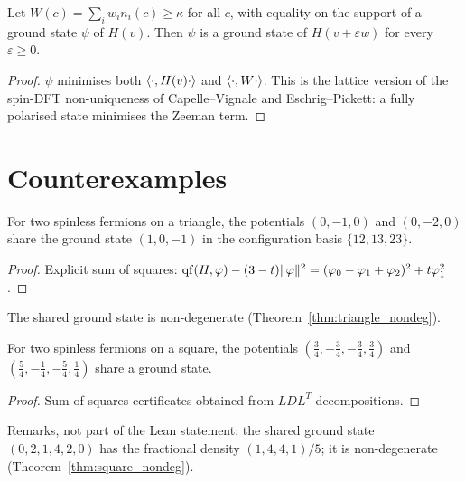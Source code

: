\begin{theorem}
  \label{thm:nonunique_of_minimiser}
  \leanok
  Let $W(c)=\sum_iw_in_i(c)\ge\kappa$ for all $c$, with equality on the support of a ground state $\psi$ of
  $H(v)$. Then $\psi$ is a ground state of $H(v+\varepsilon w)$ for every $\varepsilon\ge0$.
\end{theorem}
\begin{proof}
  \leanok
  $\psi$ minimises both $\langle \cdot, H(v)\cdot\rangle$ and $\langle \cdot, W\cdot\rangle$. This is the lattice version of the
  spin-DFT non-uniqueness of Capelle--Vignale and Eschrig--Pickett: a fully polarised state minimises the
  Zeeman term.
\end{proof}

\section{Counterexamples}

\begin{theorem}
  \label{thm:hk_fails_triangle}
  \leanok
  For two spinless fermions on a triangle, the potentials $(0,-1,0)$ and $(0,-2,0)$ share the ground state
  $(1,0,-1)$ in the configuration basis $\{12,13,23\}$.
\end{theorem}
\begin{proof}
  \leanok
  Explicit sum of squares:
  $\operatorname{qf}(H,\varphi)-(3-t)\|\varphi\|^2 = (\varphi_0-\varphi_1+\varphi_2)^2+t\varphi_1^2$.
\end{proof}
The shared ground state is non-degenerate (Theorem~\ref{thm:triangle_nondeg}).

\begin{theorem}
  \label{thm:hk_fails_square}
  \leanok
  For two spinless fermions on a square, the potentials $(\tfrac34,-\tfrac34,-\tfrac34,\tfrac34)$ and
  $(\tfrac54,-\tfrac14,-\tfrac54,\tfrac14)$ share a ground state.
\end{theorem}
\begin{proof}
  \leanok
  Sum-of-squares certificates obtained from $LDL^T$ decompositions.
\end{proof}
Remarks, not part of the Lean statement: the shared ground state $(0,2,1,4,2,0)$ has the fractional density
$(1,4,4,1)/5$; it is non-degenerate (Theorem~\ref{thm:square_nondeg}).

